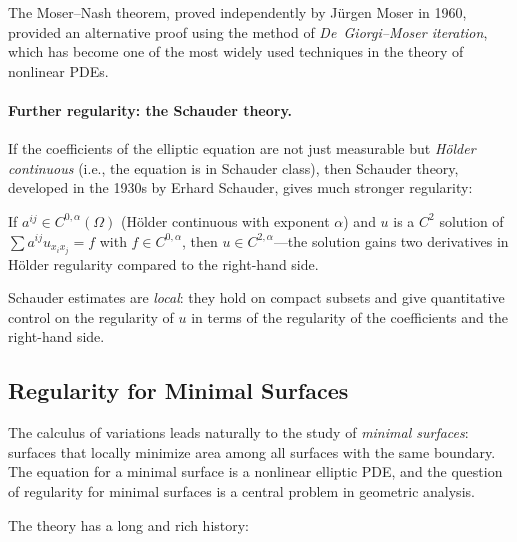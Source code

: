 The Moser--Nash theorem, proved independently by Jürgen Moser in 1960, provided an alternative proof using the method of \emph{De~Giorgi--Moser iteration}, which has become one of the most widely used techniques in the theory of nonlinear PDEs.

\paragraph{Further regularity: the Schauder theory.}
If the coefficients of the elliptic equation are not just measurable but \emph{H\"older continuous} (i.e., the equation is in Schauder class), then Schauder theory, developed in the 1930s by Erhard Schauder, gives much stronger regularity:

\begin{theorem}\label{thm:schauder}
If $a^{ij} \in C^{0,\alpha}(\Omega)$ (H\"older continuous with exponent $\alpha$) and $u$ is a $C^2$ solution of $\sum a^{ij} u_{x_i x_j} = f$ with $f \in C^{0,\alpha}$, then $u \in C^{2,\alpha}$---the solution gains two derivatives in H\"older regularity compared to the right-hand side.
\end{theorem}

Schauder estimates are \emph{local}: they hold on compact subsets and give quantitative control on the regularity of $u$ in terms of the regularity of the coefficients and the right-hand side.

\subsection{Regularity for Minimal Surfaces}

The calculus of variations leads naturally to the study of \emph{minimal surfaces}: surfaces that locally minimize area among all surfaces with the same boundary. The equation for a minimal surface is a nonlinear elliptic PDE, and the question of regularity for minimal surfaces is a central problem in geometric analysis.

The theory has a long and rich history:

